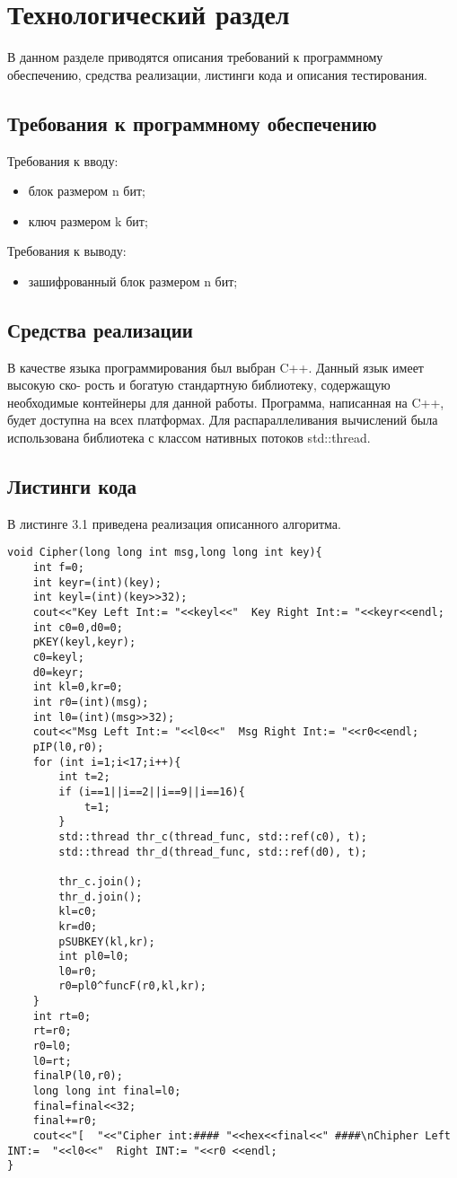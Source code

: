 \chapter{Технологический раздел}
\label{cha:impl}

В данном разделе приводятся описания требований к программному обеспечению, средства реализации, листинги кода и описания тестирования.

\section{Требования к программному обеспечению}

Требования к вводу:
\begin{itemize}
    \item блок размером n бит;
    \item ключ размером k бит;
\end{itemize}
Требования к выводу:
\begin{itemize}
    \item зашифрованный блок размером n бит;
\end{itemize}

\section{Средства реализации}

В качестве языка программирования был выбран C++. Данный язык имеет высокую ско-
рость и богатую стандартную библиотеку, содержащую необходимые контейнеры для данной
работы. Программа, написанная на C++, будет доступна на всех платформах.
Для распараллеливания вычислений была использована библиотека с классом нативных
потоков std::thread.

\section{Листинги кода}

В листинге 3.1 приведена реализация описанного алгоритма.
\begin{lstlisting}[caption=Алгоритм шифрования DES]
void Cipher(long long int msg,long long int key){
	int f=0;
	int keyr=(int)(key);
	int keyl=(int)(key>>32);
	cout<<"Key Left Int:= "<<keyl<<"  Key Right Int:= "<<keyr<<endl;
	int c0=0,d0=0;
	pKEY(keyl,keyr);
	c0=keyl;
	d0=keyr;
	int kl=0,kr=0;
	int r0=(int)(msg);
	int l0=(int)(msg>>32);
	cout<<"Msg Left Int:= "<<l0<<"  Msg Right Int:= "<<r0<<endl;
	pIP(l0,r0);
	for (int i=1;i<17;i++){
		int t=2;
		if (i==1||i==2||i==9||i==16){
			t=1;
		}
        std::thread thr_c(thread_func, std::ref(c0), t);
        std::thread thr_d(thread_func, std::ref(d0), t);

        thr_c.join();
        thr_d.join();
		kl=c0;
		kr=d0;
		pSUBKEY(kl,kr);
		int pl0=l0;
		l0=r0;
		r0=pl0^funcF(r0,kl,kr);
	}
	int rt=0;
	rt=r0;
	r0=l0;
	l0=rt;
	finalP(l0,r0);
	long long int final=l0;
	final=final<<32;
	final+=r0;
	cout<<"[  "<<"Cipher int:#### "<<hex<<final<<" ####\nChipher Left INT:=  "<<l0<<"  Right INT:= "<<r0 <<endl;
}
\end{lstlisting}


